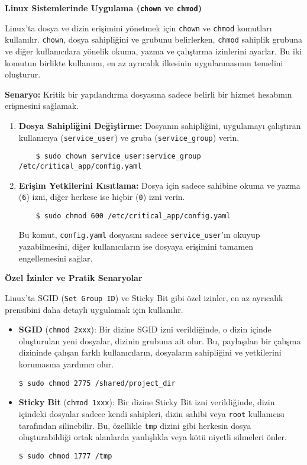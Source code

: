 \textbf{Linux Sistemlerinde Uygulama (\texttt{chown} ve \texttt{chmod})}

Linux’ta dosya ve dizin erişimini yönetmek için \texttt{chown} ve \texttt{chmod} komutları kullanılır. \texttt{chown}, dosya sahipliğini ve grubunu belirlerken, \texttt{chmod} sahiplik grubuna ve diğer kullanıcılara yönelik okuma, yazma ve çalıştırma izinlerini ayarlar. Bu iki komutun birlikte kullanımı, en az ayrıcalık ilkesinin uygulanmasının temelini oluşturur.

\textbf{Senaryo:} Kritik bir yapılandırma dosyasına sadece belirli bir hizmet hesabının erişmesini sağlamak.

\begin{enumerate}
    \item \textbf{Dosya Sahipliğini Değiştirme:} Dosyanın sahipliğini, uygulamayı çalıştıran kullanıcıya (\texttt{service\_user}) ve gruba (\texttt{service\_group}) verin.
    \begin{verbatim}
    $ sudo chown service_user:service_group /etc/critical_app/config.yaml
    \end{verbatim}
    \item \textbf{Erişim Yetkilerini Kısıtlama:} Dosya için sadece sahibine okuma ve yazma (\texttt{6}) izni, diğer herkese ise hiçbir (\texttt{0}) izni verin.
    \begin{verbatim}
    $ sudo chmod 600 /etc/critical_app/config.yaml
    \end{verbatim}
    Bu komut, \texttt{config.yaml} dosyasını sadece \texttt{service\_user}'ın okuyup yazabilmesini, diğer kullanıcıların ise dosyaya erişimini tamamen engellemesini sağlar.
\end{enumerate}

\textbf{Özel İzinler ve Pratik Senaryolar}

Linux'ta SGID (\texttt{Set Group ID}) ve Sticky Bit gibi özel izinler, en az ayrıcalık prensibini daha detaylı uygulamak için kullanılır.

\begin{itemize}
    \item \textbf{SGID} (\texttt{chmod 2xxx}): Bir dizine SGID izni verildiğinde, o dizin içinde oluşturulan yeni dosyalar, dizinin grubuna ait olur. Bu, paylaşılan bir çalışma dizininde çalışan farklı kullanıcıların, dosyaların sahipliğini ve yetkilerini korumasına yardımcı olur.
    \begin{verbatim}
$ sudo chmod 2775 /shared/project_dir
    \end{verbatim}
    \item \textbf{Sticky Bit} (\texttt{chmod 1xxx}): Bir dizine Sticky Bit izni verildiğinde, dizin içindeki dosyalar sadece kendi sahipleri, dizin sahibi veya \texttt{root} kullanıcısı tarafından silinebilir. Bu, özellikle \texttt{tmp} dizini gibi herkesin dosya oluşturabildiği ortak alanlarda yanlışlıkla veya kötü niyetli silmeleri önler.
    \begin{verbatim}
$ sudo chmod 1777 /tmp
    \end{verbatim}
\end{itemize}

